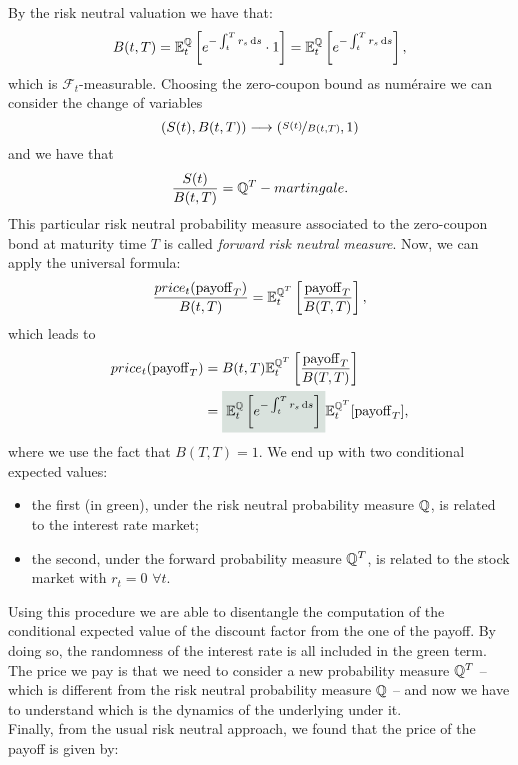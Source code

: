 \medbreak
\noindent By the risk neutral valuation we have that:
\begin{equation}
    B(t,T) = \mathbb{E}^{\mathbb{Q}}_t\left[e^{-\int_t^T r_s\,\dd s}\cdot 1\right] = \mathbb{E}^{\mathbb{Q}}_t\left[e^{-\int_t^T r_s\,\dd s}\right],
\end{equation}
which is $\mathcal{F}_t$-measurable. Choosing the zero-coupon bound as numéraire we can consider the change of variables
\begin{equation}
    (S(t), B(t,T)) \longrightarrow (\nicefrac{S(t)}{B(t,T)},1)
\end{equation}
and we have that
\begin{equation}
    \dfrac{S(t)}{B(t,T)} = \mathbb{Q}^T-martingale.
\end{equation}
This particular risk neutral probability measure associated to the zero-coupon bond at maturity time $T$ is called \emph{forward risk neutral measure}. Now, we can apply the universal formula:
\begin{align}
    \frac{price_t(\operatorname{payoff}_T)}{B(t,T)} = \mathbb{E}^{\mathbb{Q}^T}_t\left[\frac{\operatorname{payoff}_T}{B(T,T)}\right],
\end{align}
which leads to
\begin{align}
    \notag price_t(\pay_T) &= B(t,T) \mathbb{E}^{\Qmeas^T}_t\left[\frac{\pay_T}{B(T,T)}\right] \\
    &=
    \hlc{mytweed}{\expect_t\left[e^{-\int_t^T r_s\,\dd s}\right]} \mathbb{E}^{\Qmeas^T}_t[\pay_T],
\end{align}
where we use the fact that $B(T,T)=1$. We end up with two conditional expected values:
\begin{itemize}
    \item the first (in green), under the risk neutral probability measure $\mathbb{Q}$, is related to the interest rate market;
    \item the second, under the forward probability measure $\mathbb{Q}^T$, is related to the stock market with $r_t = 0$ $\forall t$.
\end{itemize}
Using this procedure we are able to disentangle the computation of the conditional expected value of the discount factor from the one of the payoff. By doing so, the randomness of the interest rate is all included in the green term. The price we pay is that we need to consider a new probability measure $\mathbb{Q}^T$ -- which is different from the risk neutral probability measure $\mathbb{Q}$ -- and now we have to understand which is the dynamics of the underlying under it.\\
Finally, from the usual risk neutral approach, we found that the price of the payoff is given by:
